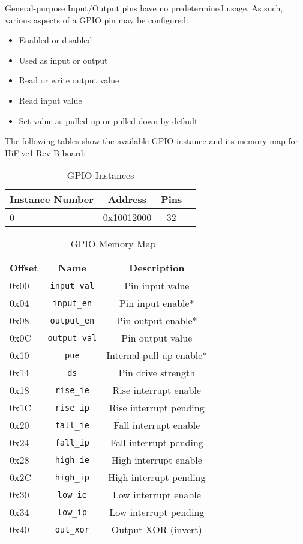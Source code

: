 General-purpose Input/Output pins have no predetermined usage. As such, various aspects of a GPIO pin may be configured:\cite{giometti2017gnu}
\begin{itemize}
    \item Enabled or disabled
    \item Used as input or output
    \item Read or write output value
    \item Read input value
    \item Set value as pulled-up or pulled-down by default
\end{itemize}

The following tables show the available GPIO instance and its memory map for HiFive1 Rev B board:
\begin{table}[H]
    \centering
    \begin{tabular}{| p{3cm} | c | c | p{3cm} |}
        \hline
        \textbf{Instance Number} & \textbf{Address} & \textbf{Pins}\\
        \hline
        \hline
        0 & 0x10012000 & 32\\
        \hline
    \end{tabular}
    \caption{GPIO Instances}
\end{table}

\begin{table}[H]
    \centering
    \begin{tabular}{| p{3cm} | c | c | p{3cm} |}
        \hline
        \textbf{Offset} & \textbf{Name} & \textbf{Description}\\
        \hline
        \hline
        0x00 & \lstinline|input_val| & Pin input value\\
        0x04 & \lstinline|input_en| & Pin input enable*\\
        0x08 & \lstinline|output_en| & Pin output enable*\\
        0x0C & \lstinline|output_val| & Pin output value\\
        0x10 & \lstinline|pue| & Internal pull-up enable*\\
        0x14 & \lstinline|ds| & Pin drive strength\\
        0x18 & \lstinline|rise_ie| & Rise interrupt enable\\
        0x1C & \lstinline|rise_ip| & Rise interrupt pending\\
        0x20 & \lstinline|fall_ie| & Fall interrupt enable\\
        0x24 & \lstinline|fall_ip| & Fall interrupt pending\\
        0x28 & \lstinline|high_ie| & High interrupt enable\\
        0x2C & \lstinline|high_ip| & High interrupt pending\\
        0x30 & \lstinline|low_ie| & Low interrupt enable\\
        0x34 & \lstinline|low_ip| & Low interrupt pending\\
        0x40 & \lstinline|out_xor| & Output XOR (invert)\\
        \hline
    \end{tabular}
    \caption{GPIO Memory Map}
    \label{tab:gpio_memory_map}
\end{table}

